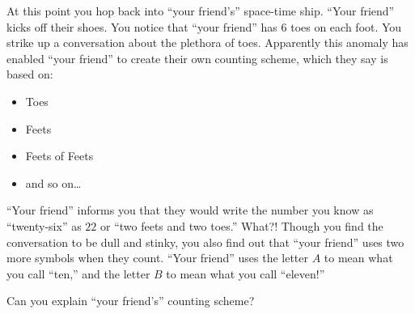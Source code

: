 At this point you hop back into ``your friend's'' space-time
ship. ``Your friend'' kicks off their shoes. You notice that ``your
friend'' has 6 toes on each foot. You strike up a conversation about
the plethora of toes. Apparently this anomaly has enabled ``your
friend'' to create their own counting scheme, which they say is based
on:
\begin{itemize}
\item Toes
\item Feets
\item Feets of Feets
\item and so on\dots
\end{itemize}
``Your friend'' informs you that they would write the number you know
as ``twenty-six'' as $22$ or ``two feets and two toes.'' What?! Though
you find the conversation to be dull and stinky, you also find out
that ``your friend'' uses two more symbols when they count. ``Your
friend'' uses the letter $A$ to mean what you call ``ten,'' and the
letter $B$ to mean what you call ``eleven!''

\begin{question} Can you explain ``your friend's'' counting scheme?
\end{question}
\QM




